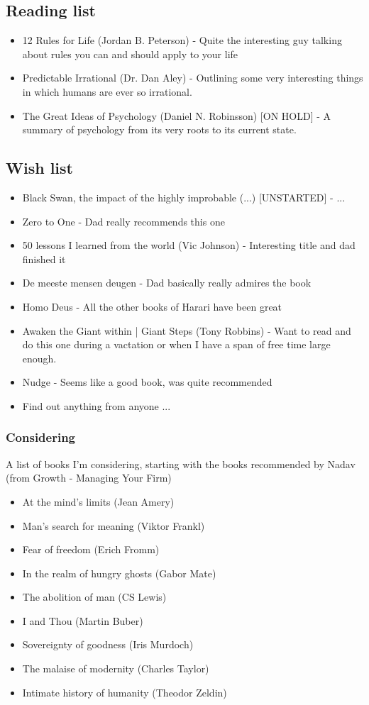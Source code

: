 \documentclass[12pt,a4paper]{article} %
\begin{document}
\subsection{Reading list}
\begin{itemize}
\item 12 Rules for Life (Jordan B. Peterson) - Quite the interesting guy talking about rules you can and should apply to your life
\item Predictable Irrational (Dr. Dan Aley) - Outlining some very interesting things in which humans are ever so irrational.

\item The Great Ideas of Psychology (Daniel N. Robinsson) [ON HOLD] - A summary of psychology from its very roots to its current state.
\end{itemize}
\subsection{Wish list}
\begin{itemize}

\item Black Swan, the impact of the highly improbable (...) [UNSTARTED] - ...
\item Zero to One - Dad really recommends this one
\item 50 lessons I learned from the world (Vic Johnson) - Interesting title and dad finished it
\item De meeste mensen deugen - Dad basically really admires the book
\item Homo Deus - All the other books of Harari have been great
\item Awaken the Giant within | Giant Steps (Tony Robbins) - Want to read and do this one during a vactation or when I have a span of free time large enough.
\item Nudge - Seems like a good book, was quite recommended
\item Find out anything from anyone ...

\end{itemize}
\subsubsection{Considering}
A list of books I'm considering, starting with the books recommended by Nadav (from Growth - Managing Your Firm)
\begin{itemize}
\item At the mind’s limits (Jean Amery)
\item Man’s search for meaning (Viktor Frankl)
\item Fear of freedom (Erich Fromm)
\item In the realm of hungry ghosts (Gabor Mate)
\item The abolition of man (CS Lewis)
\item I and Thou (Martin Buber)
\item Sovereignty of goodness (Iris Murdoch)
\item The malaise of modernity (Charles Taylor)
\item Intimate history of humanity (Theodor Zeldin)
\end{itemize}
\end{document}
